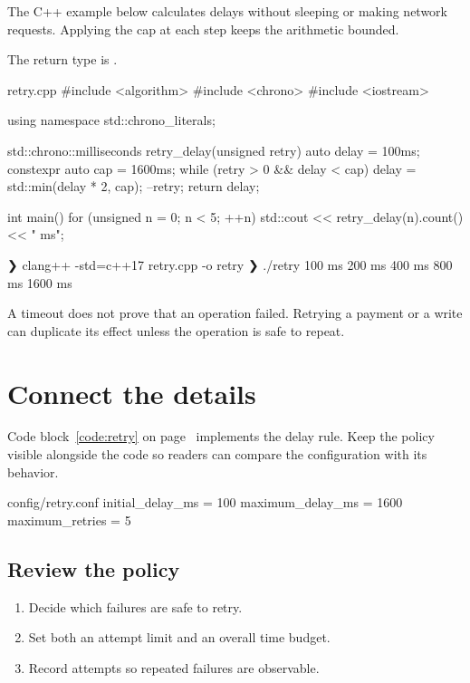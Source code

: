 \documentclass{article}
\begin{document}
The C++ example below calculates delays without sleeping or making network
requests. Applying the cap at each step keeps the arithmetic bounded.

The return type is .

\begin{cpp}[label=code:retry]{retry.cpp}
#include <algorithm>
#include <chrono>
#include <iostream>

using namespace std::chrono_literals;

std::chrono::milliseconds retry_delay(unsigned retry) {
    auto delay = 100ms;
    constexpr auto cap = 1600ms;
    while (retry > 0 && delay < cap) {
        delay = std::min(delay * 2, cap);
        --retry;
    }
    return delay;
}

int main() {
    for (unsigned n = 0; n < 5; ++n) {
        std::cout << retry_delay(n).count() << " ms\n";
    }
}
\end{cpp}

\begin{terminal}[title={Build and run}]
❯ clang++ -std=c++17 retry.cpp -o retry
❯ ./retry
100 ms
200 ms
400 ms
800 ms
1600 ms
\end{terminal}

\begin{warning}
A timeout does not prove that an operation failed. Retrying a payment or a
write can duplicate its effect unless the operation is safe to repeat.
\end{warning}

\newpage
\section{Connect the details}

Code block~\ref{code:retry} on page~\pageref{code:retry} implements the delay
rule. Keep the policy visible alongside the code so readers can compare the
configuration with its behavior.

\begin{codeblock}[label=code:config]{config/retry.conf}
initial_delay_ms = 100
maximum_delay_ms = 1600
maximum_retries = 5
\end{codeblock}

\subsection{Review the policy}

\begin{enumerate}
    \item Decide which failures are safe to retry.
    \item Set both an attempt limit and an overall time budget.
    \item Record attempts so repeated failures are observable.
\end{enumerate}
\end{document}
